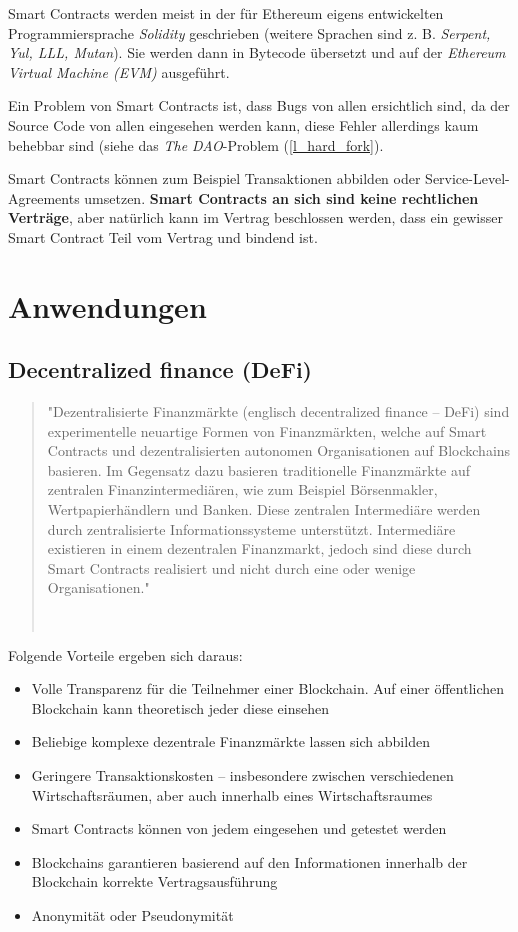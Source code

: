 Smart Contracts werden meist in der für Ethereum eigens entwickelten Programmiersprache \textit{Solidity} geschrieben (weitere Sprachen sind z. B. \textit{Serpent, Yul, LLL, Mutan}). Sie werden dann in Bytecode übersetzt und auf der \textit{Ethereum Virtual Machine (EVM)} ausgeführt.

Ein Problem von Smart Contracts ist, dass Bugs von allen ersichtlich sind, da der Source Code von allen eingesehen werden kann, diese Fehler allerdings kaum behebbar sind (siehe das \textit{The DAO}-Problem (\ref{l_hard_fork}).

Smart Contracts können zum Beispiel Transaktionen abbilden oder Service-Level-Agreements umsetzen. \textbf{Smart Contracts an sich sind keine rechtlichen Verträge}, aber natürlich kann im Vertrag beschlossen werden, dass ein gewisser Smart Contract Teil vom Vertrag und bindend ist.

\cite[vgl. Wikipedia, Ethereum]{Ethereum_Wikipedia}


\section{Anwendungen}
\subsection{Decentralized finance (DeFi)}
\begin{quote}
\begin{itshape}
"Dezentralisierte Finanzmärkte (englisch decentralized finance -- DeFi) sind experimentelle neuartige Formen von Finanzmärkten, welche auf Smart Contracts und dezentralisierten autonomen Organisationen auf Blockchains basieren. Im Gegensatz dazu basieren traditionelle Finanzmärkte auf zentralen Finanzintermediären, wie zum Beispiel Börsenmakler, Wertpapierhändlern und Banken. Diese zentralen Intermediäre werden durch zentralisierte Informationssysteme unterstützt. Intermediäre existieren in einem dezentralen Finanzmarkt, jedoch sind diese durch Smart Contracts realisiert und nicht durch eine oder wenige Organisationen."
\end{itshape}
\ \cite[Wikipedia, Dezentralisierte Finanzmärkte]{Dezentralisierte_Finanzmaerkte}
\end{quote}

Folgende Vorteile ergeben sich daraus:
\begin{itemize}
\item Volle Transparenz für die Teilnehmer einer Blockchain. Auf einer öffentlichen Blockchain kann theoretisch jeder diese einsehen
\item Beliebige komplexe dezentrale Finanzmärkte lassen sich abbilden
\item Geringere Transaktionskosten -- insbesondere zwischen verschiedenen Wirtschaftsräumen, aber auch innerhalb eines Wirtschaftsraumes
\item Smart Contracts können von jedem eingesehen und getestet werden
\item Blockchains garantieren basierend auf den Informationen innerhalb der Blockchain korrekte Vertragsausführung
\item Anonymität oder Pseudonymität
\end{itemize}

